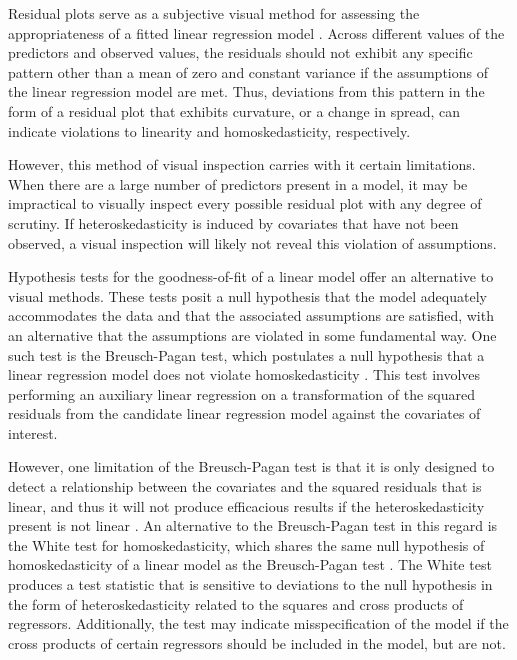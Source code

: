 \documentclass[submit]{smj}
\begin{document}
		Residual plots serve as a subjective visual method for assessing the appropriateness of a fitted linear regression model \citet{Miles}. Across different values
		of the predictors and observed values, the residuals should not exhibit any specific pattern other than a mean of zero and constant variance if the assumptions of the linear regression model are met.
		Thus, deviations from this pattern in the form of a residual plot that exhibits curvature, or a change in spread, can indicate violations to linearity and homoskedasticity, respectively. 

		However, this method of visual inspection carries with it certain limitations. When there are a large number of predictors present in a model, it may be impractical to visually inspect every
		possible residual plot with any degree of scrutiny. If heteroskedasticity is induced by covariates that have not been observed, a visual inspection will likely
		not reveal this violation of assumptions.

		Hypothesis tests for the goodness-of-fit of a linear model offer an alternative to visual methods. These tests posit a null hypothesis that the model adequately accommodates the data and that
		the associated assumptions are satisfied, with an alternative that the assumptions are violated in some fundamental way. One such test is the Breusch-Pagan test, which postulates a null hypothesis
		that a linear regression model does not violate homoskedasticity \citet{Breusch}. This test involves performing an auxiliary linear regression on a transformation of the squared residuals from
		the candidate linear regression model against the covariates of interest.

		However, one limitation of the Breusch-Pagan test is that it is only designed to detect a relationship between the covariates and the squared residuals that is linear, and thus it will not
		produce efficacious results if the heteroskedasticity present is not linear \citet{Waldman}. An alternative to the Breusch-Pagan test in this regard is the White test for homoskedasticity,
		which shares the same null hypothesis of homoskedasticity of a linear model as the Breusch-Pagan test \citet{White1980}. The White test produces a test statistic that is sensitive to deviations to
		the null hypothesis in the form of heteroskedasticity related to the squares and cross products of regressors. Additionally, the test may indicate misspecification of the model if the cross products
		of certain regressors should be included in the model, but are not.
\end{document}
